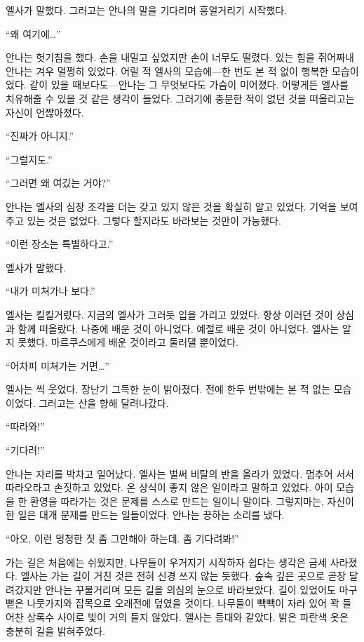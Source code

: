 엘사가 말했다. 그러고는 안나의 말을 기다리며 흥얼거리기 시작했다.

``왜 여기에\ldots''

안나는 헛기침을 했다. 손을 내밀고 싶었지만 손이 너무도 떨렸다. 있는 힘을 쥐어짜내 안나는 겨우 멀쩡히 있었다. 어릴 적 엘사의 모습에—한 번도 본 적 없이 행복한 모습이었다. 같이 있을 때보다도—안나는 그 무엇보다도 가슴이 미어졌다. 어떻게든 엘사를 치유해줄 수 있을 것 같은 생각이 들었다. 그러기에 충분한 적이 없던 것을 떠올리고는 자신이 언짢아졌다.

``진짜가 아니지.''

``그럴지도.''

``그러면 왜 여깄는 거야?''

안나는 엘사의 심장 조각을 더는 갖고 있지 않은 것을 확실히 알고 있었다. 기억을 보여주고 있는 것은 없었다. 그렇다 할지라도 바라보는 것만이 가능했다.

``이런 장소는 특별하다고.''

엘사가 말했다.

``내가 미쳐가나 보다.''

엘사는 킬킬거렸다. 지금의 엘사가 그러듯 입을 가리고 있었다. 항상 이러던 것이 상심과 함께 떠올랐다. 나중에 배운 것이 아니었다. 예절로 배운 것이 아니었다. 엘사는 알지 못했다. 마르쿠스에게 배운 것이라고 둘러댈 뿐이었다.

``어차피 미쳐가는 거면\ldots''

엘사는 씩 웃었다. 장난기 그득한 눈이 밝아졌다. 전에 한두 번밖에는 본 적 없는 모습이었다. 그러고는 산을 향해 달려나갔다.

``따라와!''

``기다려!''

안나는 자리를 박차고 일어났다. 엘사는 벌써 비탈의 반을 올라가 있었다. 멈추어 서서 따라오라고 손짓하고 있었다. 온 상식이 좋지 않은 일이라고 말하고 있었다. 아이 모습을 한 환영을 따라가는 것은 문제를 스스로 만드는 일이니 말이다. 그렇지마는, 자신이 한 일은 대개 문제를 만드는 일들이었다. 안나는 끙하는 소리를 냈다.

``아오, 이런 멍청한 짓 좀 그만해야 하는데. 좀 기다려봐!''

가는 길은 처음에는 쉬웠지만, 나무들이 우거지기 시작하자 쉽다는 생각은 금세 사라졌다. 엘사는 가는 길이 거친 것은 전혀 신경 쓰지 않는 듯했다. 숲속 깊은 곳으로 곧장 달려갔지만 안나는 꾸물거리며 모든 길을 의심의 눈으로 바라보았다. 길이 있었어도 마구 뻗은 나뭇가지와 잡목으로 오래전에 덮였을 것이다. 나무들이 빽빽이 자라 있어 꽉 들어찬 상록수 사이로 빛이 거의 들지 않았다. 엘사는 등대와 같았다. 밝은 파란색 옷은 충분히 길을 밝혀주었다.


